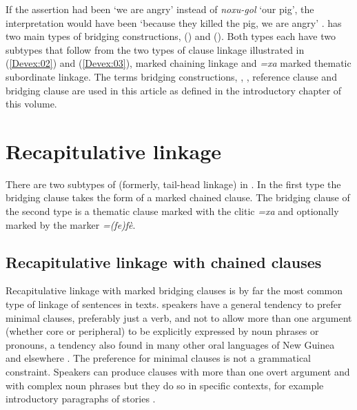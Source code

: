 \documentclass[output=paper]{LSP/langsci}
\begin{document}
If the assertion had been `we are angry' instead of \textit{noxu-gol} `our pig', the interpretation would have been `because they killed the pig, we are angry' \citep[][826]{devries.2006}.  has two main types of bridging constructions,  ()
and  (). Both types each have two subtypes that follow from the two types of clause linkage illustrated in (\ref{Devex:02}) and (\ref{Devex:03}),  marked chaining linkage and \textit{=xa} marked thematic subordinate linkage. The terms bridging constructions, , , reference clause and bridging clause are used in this article as defined in the introductory chapter of this volume.


\section{Recapitulative linkage} 
\label{Devrecap.link}
There are two subtypes of  (formerly, tail-head linkage) in  \citep[][372--374]{devries.2005}. In the first type the bridging clause takes the form of a  marked chained clause. The bridging clause of the second type is a thematic clause marked with the clitic \textit{=xa} and optionally marked by the  marker \textit{=(fe)fè}. 

\subsection{Recapitulative linkage with chained clauses} 
\label{Devrecap.link.chained}
Recapitulative linkage with  marked bridging clauses is by far the most common type of linkage of sentences  in  texts.  speakers have a general tendency to prefer minimal clauses, preferably just a verb, and not to allow more than one argument (whether core or peripheral) to be explicitly expressed by noun phrases or pronouns, a tendency also found in many other oral languages of New Guinea and elsewhere \citep{foley.2000,dubois87}. The preference for minimal clauses is not a grammatical constraint. Speakers can produce clauses with more than one overt argument and with complex noun phrases but they do so in specific contexts, for example introductory paragraphs of stories \citep[][369]{devries.2005}.
\end{document}
